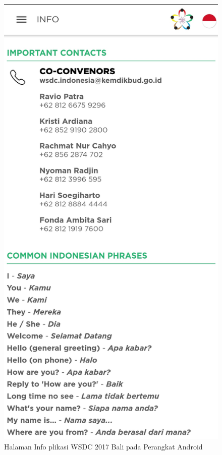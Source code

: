 \begin{enumerate}
	\begin{figure}[H]
	    \centering
	    \includegraphics[scale=0.12]{Gambar/Info.jpg}
	    \caption{Halaman Info plikasi WSDC 2017 Bali pada Perangkat Android}
	    \label{fig:wsdcappinfo}
	\end{figure}
\end{enumerate}

